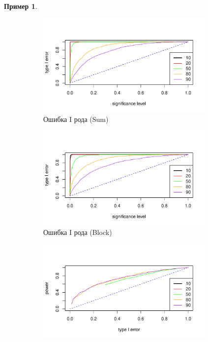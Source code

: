 \documentclass[specialist,
substylefile = spbu_report.rtx,
subf,href,colorlinks=true, 12pt]{disser}
\theoremstyle{definition}
\newtheorem{example}{Пример}
\begin{document}
\begin{example}
	\begin{figure}[h!]
		\captionsetup[subfigure]{justification=Centering}
		\begin{subfigure}[t]{0.5\textwidth}
			\centering
			\includegraphics[width=0.95\textwidth]{img/type1error_sum_fa_phi3.pdf}
			\caption{Ошибка I рода (Sum)}
		\end{subfigure}\hspace{\fill}
		\begin{subfigure}[t]{0.5\textwidth}
			\centering
			\includegraphics[width=0.95\textwidth]{img/type1error_block_fa_phi3.pdf}
			\caption{Ошибка I рода (Block)}
		\end{subfigure}
		\bigskip
		\begin{subfigure}[t]{0.5\textwidth}
			\centering
			\includegraphics[width=0.95\textwidth]{img/roc_sum_fa_phi3_omega0075.pdf}

\end{subfigure}
\end{figure}
\end{example}
\end{document}
